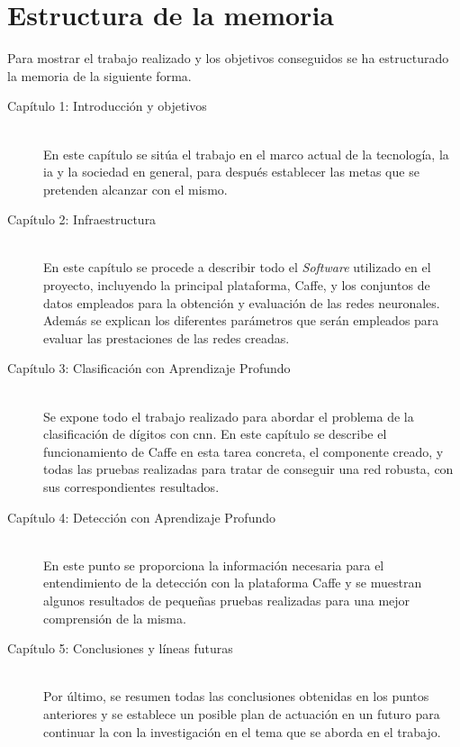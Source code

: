 \section{Estructura de la memoria}
Para mostrar el trabajo realizado y los objetivos conseguidos se ha estructurado la memoria de la siguiente forma.

\begin{description}
	\item[Capítulo 1: Introducción y objetivos] \hfill 
	\vspace{5pt}
	\\
	En este capítulo se sitúa el trabajo en el marco actual de la tecnología, la \acrshort{ia} y la sociedad en general, para después establecer las metas que se pretenden alcanzar con el mismo. 
	\vspace{10pt}
	\item[Capítulo 2: Infraestructura] \hfill 
	\vspace{5pt}
	\\
	En este capítulo se procede a describir todo el \textit{Software} utilizado en el proyecto, incluyendo la principal plataforma, Caffe, y los conjuntos de datos empleados para la obtención y evaluación de las redes neuronales. Además se explican los diferentes parámetros que serán empleados para evaluar las prestaciones de las redes creadas.
	\vspace{10pt}
	\item[Capítulo 3: Clasificación con Aprendizaje Profundo ] \hfill 
	\vspace{5pt}
	\\
	Se expone todo el trabajo realizado para abordar el problema de la clasificación de dígitos con \acrshort{cnn}. En este capítulo se describe el funcionamiento de Caffe en esta tarea concreta, el componente creado, y todas las pruebas realizadas para tratar de conseguir una red robusta, con sus correspondientes resultados.
	\vspace{10pt}
	\item[Capítulo 4: Detección con Aprendizaje Profundo ] \hfill 
	\vspace{5pt}
	\\
	En este punto se proporciona la información necesaria para el entendimiento de la detección con la plataforma Caffe y se muestran algunos resultados de pequeñas pruebas realizadas para una mejor comprensión de la misma.
	\vspace{10pt}
	\item[Capítulo 5: Conclusiones y líneas futuras] \hfill 
	\vspace{5pt}
	\\
	Por último, se resumen todas las conclusiones obtenidas en los puntos anteriores y se establece un posible plan de actuación en un futuro para continuar la con la investigación en el tema que se aborda en el trabajo.
\end{description}